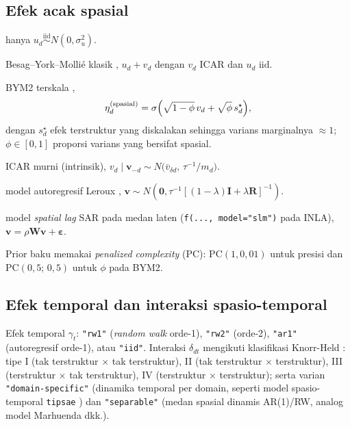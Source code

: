 \documentclass[11pt,a4paper]{article}
\theoremstyle{definition}
\begin{document}
\subsection{Efek acak spasial}

\begin{description}[nosep]
  \item[\texttt{"none"}:] hanya $u_d \overset{\text{iid}}{\sim} N(0, \sigma_u^2)$.
  \item[\texttt{"bym"}:] Besag--York--Molli\'e klasik \cite{besag1991},
    $u_d + v_d$ dengan $v_d$ ICAR dan $u_d$ iid.
  \item[\texttt{"bym2"}:] BYM2 terskala \cite{riebler2016},
    \begin{equation}
      \eta_d^{\text{(spasial)}} = \sigma\Bigl(\sqrt{1-\phi}\,v_d + \sqrt{\phi}\,s_d^{\star}\Bigr),
    \end{equation}
    dengan $s_d^{\star}$ efek terstruktur yang diskalakan sehingga varians
    marginalnya $\approx 1$; $\phi \in [0,1]$ proporsi varians yang bersifat spasial.
  \item[\texttt{"besag"}:] ICAR murni (intrinsik),
    $v_d \mid \mathbf{v}_{-d} \sim N\bigl(\bar{v}_{\delta d},\, \tau^{-1}/m_d\bigr)$.
  \item[\texttt{"generic1"}:] model autoregresif Leroux \cite{leroux2000},
    $\mathbf{v} \sim N(\mathbf{0}, \tau^{-1}[(1-\lambda)\mathbf{I} + \lambda\mathbf{R}]^{-1})$.
  \item[\texttt{"slm"}:] model \emph{spatial lag} SAR pada medan laten
    (\texttt{f(..., model="slm")} pada INLA),
    $\mathbf{v} = \rho\mathbf{W}\mathbf{v} + \boldsymbol{\varepsilon}$.
\end{description}
Prior baku memakai \emph{penalized complexity} (PC): $\mathrm{PC}(1, 0{,}01)$ untuk
presisi dan $\mathrm{PC}(0{,}5;\, 0{,}5)$ untuk $\phi$ pada BYM2.

\subsection{Efek temporal dan interaksi spasio-temporal}

Efek temporal $\gamma_t$: \texttt{"rw1"} (\emph{random walk} orde-1),
\texttt{"rw2"} (orde-2), \texttt{"ar1"} (autoregresif orde-1), atau \texttt{"iid"}.
Interaksi $\delta_{dt}$ mengikuti klasifikasi Knorr-Held \cite{knorrheld2000}:
tipe I (tak terstruktur $\times$ tak terstruktur), II (tak terstruktur $\times$
terstruktur), III (terstruktur $\times$ tak terstruktur), IV (terstruktur $\times$
terstruktur); serta varian \texttt{"domain-specific"} (dinamika temporal per domain,
seperti model spasio-temporal \texttt{tipsae} \cite{denicolo2024}) dan
\texttt{"separable"} (medan spasial dinamis AR(1)/RW, analog model Marhuenda dkk.).
\end{document}
